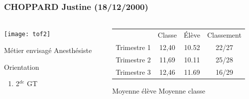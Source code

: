 \documentclass{beamer}
\begin{document}
\begin{frame}
	\frametitle{CHOPPARD Justine (18/12/2000)}  
	\framesubtitle{ }	
	
	
	\begin{columns}[onlytextwidth]
		
		
		
		\begin{column}{0.3\textwidth}
			\vspace*{-.5cm}
			\begin{center}
				\texttt{[image: tof2]}
			\end{center}
			
			
			\begin{block}{Métier envisagé}
				Anesthésiste
			\end{block}
			
			\begin{alertblock}{Orientation}
				\begin{enumerate}
					\item 2$^{de}$ GT
				\end{enumerate}
			\end{alertblock}
			
			
		\end{column}	
		
	\begin{column}{0.70\textwidth}
		
		\begin{center}
			
			\vspace*{-.7cm}	
			
			{\small \begin{tabular}{cccc}
					& Classe                       & \'Elève                      & Classement                   \\
					{\color[HTML]{00009B} Trimestre 1} & {\color[HTML]{00009B} 12,40} & {\color[HTML]{00009B} 10.52} & {\color[HTML]{00009B} 22/27} \\
					{\color[HTML]{FE0000} Trimestre 2} & {\color[HTML]{FE0000} 11,69} & {\color[HTML]{FE0000} 10.11} & {\color[HTML]{FE0000} 25/28} \\
					{\color[HTML]{34FF34} Trimestre 3} & {\color[HTML]{34FF34} 12,46} & {\color[HTML]{34FF34} 11.69} & {\color[HTML]{34FF34} 16/29}
				\end{tabular}}
				
				
				
				{\color{blue} Moyenne élève}
				{\color{red} Moyenne classe}
				
				\vspace*{-0.8cm}
				

\end{center}
\end{column}
\end{columns}
\end{frame}
\end{document}
